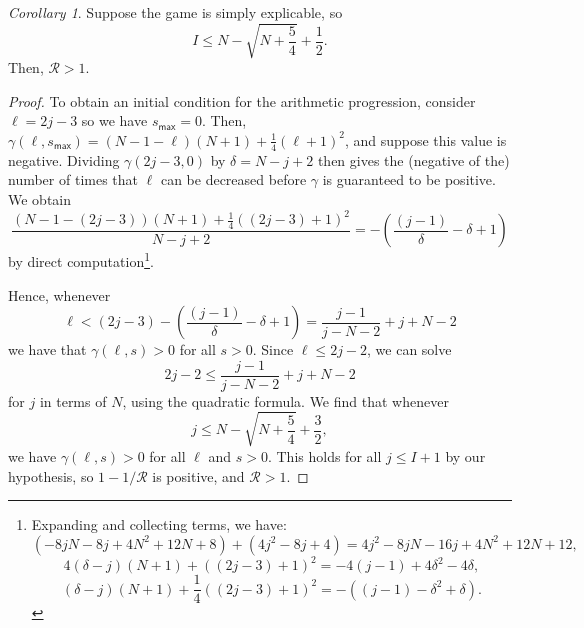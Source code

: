 \documentclass[11pt]{amsart}   %
\theoremstyle{definition}
\theoremstyle{remark}
\numberwithin{equation}{section}
\theoremstyle{theorem}
\newtheorem{corollary}[theorem]{Corollary}
\begin{document}
\begin{corollary}\label{c:r1}
Suppose the game is simply explicable, so 
\[ I \leq N - \sqrt{N+\frac{5}{4}} + \frac{1}{2}. \]
Then, $\mathcal{R} > 1$.
\end{corollary}
\begin{proof}
To obtain an initial condition for the arithmetic progression, consider $\ell = 2j-3$ so we have $s_{\mathsf{max}} = 0$.  Then, $\gamma(\ell, s_{\mathsf{max}}) =  (N-1-\ell)(N+1) + \frac{1}{4}(\ell+1)^2$, and suppose this value is negative.  Dividing $\gamma(2j-3, 0)$ by $\delta = N-j+2$ then gives the (negative of the) number of times that $\ell$ can be decreased before $\gamma$ is guaranteed to be positive.  We obtain
\[ \frac{ (N-1-(2j - 3))(N+1) + \frac{1}{4}((2j-3)+1)^2 } { N-j + 2}   = -\left( \frac{(j-1)}{\delta} - \delta + 1 \right) \]
by direct computation\footnote{Expanding and collecting terms, we have:
\[ (-8jN-8j+4N^2+12N+8) + (4j^2 - 8j + 4)  = 4j^2 - 8 jN - 16 j + 4N^2 + 12 N + 12, \]
\[ 4(\delta-j )(N+1) + ((2j-3)+1)^2   = -4(j-1) + 4 \delta^2 - 4 \delta,  \]
\[ (\delta-j )(N+1) + \frac{1}{4}((2j-3)+1)^2   = -\left( (j-1) - \delta^2 + \delta \right). \]}.

Hence, whenever 
\[ \ell < (2j-3)-\left( \frac{(j-1)}{\delta} - \delta + 1 \right) = \frac{j-1}{j-N-2} + j + N - 2 \]
we have that $\gamma(\ell, s) > 0$ for all $s > 0$.
Since $\ell \leq 2j-2$, we can solve
\[ 2j-2 \leq \frac{j-1}{j-N-2} + j + N - 2 \]
for $j$ in terms of $N$, using the quadratic formula.  We find that whenever
\[ j \leq N - \sqrt{N+\frac{5}{4}} + \frac{3}{2}, \]
we have $\gamma(\ell, s) > 0$ for all $\ell$ and $s > 0$.  This holds for all
$j \leq I+1$ by our hypothesis, so $1-1/\mathcal{R}$ is positive, and $\mathcal{R} > 1$.
\end{proof}
\end{document}
